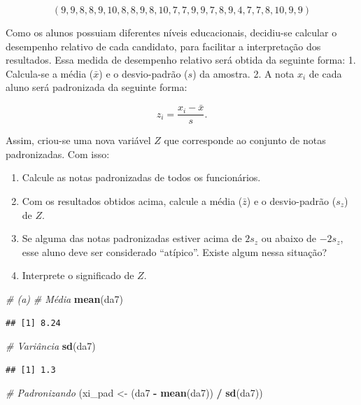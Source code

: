 \documentclass[]{article}
\newenvironment{Shaded}{\begin{snugshade}}{\end{snugshade}}
\newcommand{\KeywordTok}[1]{\textcolor[rgb]{0.13,0.29,0.53}{\textbf{#1}}}
\newcommand{\StringTok}[1]{\textcolor[rgb]{0.31,0.60,0.02}{#1}}
\newcommand{\CommentTok}[1]{\textcolor[rgb]{0.56,0.35,0.01}{\textit{#1}}}
\newcommand{\OperatorTok}[1]{\textcolor[rgb]{0.81,0.36,0.00}{\textbf{#1}}}
\newcommand{\NormalTok}[1]{#1}
\providecommand{\tightlist}{%
  \setlength{\itemsep}{0pt}\setlength{\parskip}{0pt}}
\begin{document}
\[(9, 9, 8, 8, 9, 10, 8, 8, 9, 8, 10, 7, 7, 9, 9, 7, 8, 9, 4, 7, 7, 8, 10, 9, 9)\]

Como os alunos possuiam diferentes níveis educacionais, decidiu-se
calcular o desempenho relativo de cada candidato, para facilitar a
interpretação dos resultados. Essa medida de desempenho relativo será
obtida da seguinte forma: 1. Calcula-se a média (\(\bar x\)) e o
desvio-padrão (\(s\)) da amostra. 2. A nota \(x_i\) de cada aluno será
padronizada da seguinte forma:

\[z_i = \frac{x_i - \bar x}{s}.\]

Assim, criou-se uma nova variável \(Z\) que corresponde ao conjunto de
notas padronizadas. Com isso:

\begin{enumerate}
\def\labelenumi{(\alph{enumi})}
\tightlist
\item
  Calcule as notas padronizadas de todos os funcionários.
\item
  Com os resultados obtidos acima, calcule a média (\(\bar z\)) e o
  desvio-padrão (\(s_z\)) de \(Z\).
\item
  Se alguma das notas padronizadas estiver acima de \(2s_z\) ou abaixo
  de \(-2s_z\), esse aluno deve ser considerado ``atípico''. Existe
  algum nessa situação?
\item
  Interprete o significado de \(Z\).
\end{enumerate}

\begin{Shaded}
\begin{Highlighting}[]
\CommentTok{# (a)}
\CommentTok{# Média}
\KeywordTok{mean}\NormalTok{(da7)}
\end{Highlighting}
\end{Shaded}

\begin{verbatim}
## [1] 8.24
\end{verbatim}

\begin{Shaded}
\begin{Highlighting}[]
\CommentTok{# Variância}
\KeywordTok{sd}\NormalTok{(da7)}
\end{Highlighting}
\end{Shaded}

\begin{verbatim}
## [1] 1.3
\end{verbatim}

\begin{Shaded}
\begin{Highlighting}[]
\CommentTok{# Padronizando}
\NormalTok{(xi_pad <-}\StringTok{ }\NormalTok{(da7 }\OperatorTok{-}\StringTok{ }\KeywordTok{mean}\NormalTok{(da7)) }\OperatorTok{/}\StringTok{ }\KeywordTok{sd}\NormalTok{(da7))}
\end{Highlighting}
\end{Shaded}
\end{document}
